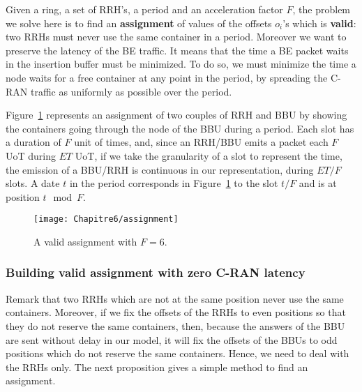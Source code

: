 Given a ring, a set of RRH's, a period and an acceleration factor $F$, the problem we solve here is to find an \textbf{assignment} of values of the offsets $o_i$'s which is \textbf{valid}: two RRHs must never use the same container in a period. Moreover we want to preserve the latency of the BE traffic. It means that the time a BE packet waits in the insertion buffer must be minimized. To do so, we must minimize the time a node waits for a free container at any point in the period, by spreading the C-RAN traffic as uniformly as possible over the period. %

Figure~\ref{fig:assignmentngreen} represents an assignment of two couples of RRH and BBU by showing the containers going through the node of the BBU during a period. Each slot has a duration of $F$ unit of times, and, since an RRH/BBU emits a packet each $F$ UoT during $ET$ UoT, if we take the granularity of a slot to represent the time, the emission of a BBU/RRH is continuous in our representation, during $ET/F$ slots. A date $t$ in the period corresponds in Figure~\ref{fig:assignmentngreen} to the slot $t/F$ and is at position $t \mod F$.

\begin{figure}[h!]
\begin{center}   

      \texttt{[image: Chapitre6/assignment]}
     \caption{A valid assignment with $F = 6$.}\label{fig:assignmentngreen}
     
\end{center}
  \end{figure}
    

 \subsubsection{Building valid assignment with zero C-RAN latency}\label{sec:zerolatency}
Remark that two RRHs which are not at the same position never use the same containers. Moreover, if we fix the offsets of the RRHs to even positions so that they do not reserve the same containers, then, because the answers of the BBU are sent without delay in our model, it will fix the offsets of the BBUs to odd positions which do not reserve the same containers. Hence, we need to deal with the RRHs only.
The next proposition gives a simple method to find an assignment.

